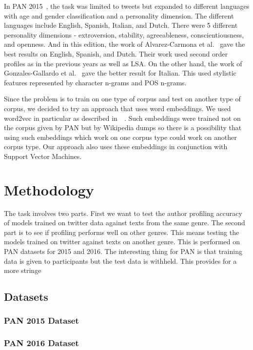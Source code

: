 \documentclass[conference]{IEEEtran}
\begin{document}
In PAN 2015~\cite{rangel2015overview}, the task was limited to tweets but expanded to different languages with age and gender classification and a personality dimension. The different languages include English, Spanish, Italian, and Dutch. There were 5 different personality dimensions - extroversion, stability, agreeableness, conscientiousness, and openness. And in this edition, the work of Alvarez-Carmona et al.~\cite{alvarezinaoe} gave the best results on English, Spanish, and Dutch. Their work used second order profiles as in the previous years as well as LSA. On the other hand, the work of Gonzales-Gallardo et al.~\cite{gonzaleztweets} gave the better result for Italian. This used stylistic features represented by character n-grams and POS n-grams.

Since the problem is to train on one type of corpus and test on another type of corpus, we decided to try an approach that uses word embeddings. We used word2vec in particular as described in~\cite{mikolov2013efficient}~\cite{mikolov2013distributed}. Such embeddings were trained not on the corpus given by PAN but by Wikipedia dumps so there is a possibility that using such embeddings which work on one corpus type could work on another corpus type. Our approach also uses these embeddings in conjunction with Support Vector Machines.
\section{Methodology}
The task involves two parts. First we want to test the author profiling accuracy of models trained on twitter data against texts from the same genre. The second part is to see if profiling performs well on other genres. This means testing the models trained on twitter against texts on another genre. This is performed on PAN datasets for 2015 and 2016. The interesting thing for PAN is that training data is given to participants but the test data is withheld. This provides for a more stringe

\subsection{Datasets}
\subsubsection{PAN 2015 Dataset}
\subsubsection{PAN 2016 Dataset}
\end{document}
